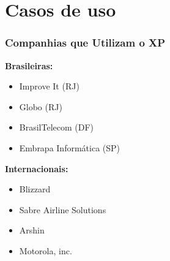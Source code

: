 \documentclass[10pt]{beamer}
\begin{document}
\section{Casos de uso}
\begin{frame}
  \frametitle{Companhias que Utilizam o XP}
  \textbf{Brasileiras:}
  \begin{itemize}
    \item Improve It (RJ)
    \item Globo (RJ)
    \item BrasilTelecom (DF)
    \item Embrapa Informática (SP)
  \end{itemize}
  \textbf{Internacionais:}
  \begin{itemize}
    \item Blizzard
    \item Sabre Airline Solutions
    \item Arshin
    \item Motorola, inc.
  \end{itemize}
\end{frame}
\end{document}
